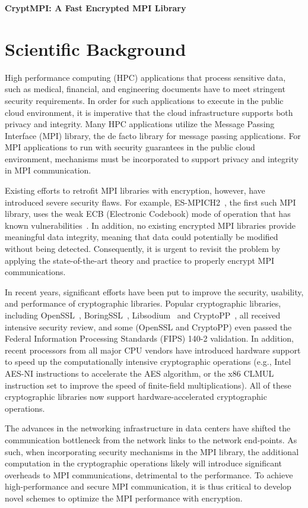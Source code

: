\centerline{\Large\bfseries CryptMPI: A Fast Encrypted MPI Library}

\section{Scientific Background}
High performance computing (HPC) applications that process %
sensitive data, such as medical, financial, and engineering documents have
to meet stringent security requirements. In order for such applications to execute in
the public cloud environment, it is imperative that the cloud infrastructure
supports both privacy and integrity. Many HPC applications utilize the Message
Passing Interface (MPI) library, the de facto library for message
passing applications. For MPI applications to run with security
guarantees in the public cloud environment, mechanisms must be
incorporated to support privacy and integrity in MPI communication.

Existing efforts to retrofit MPI libraries with encryption, however,
have introduced severe security flaws. For example,
ES-MPICH2~\cite{Ruan:2012:EMP:2197079.2197242}, the first such MPI library,
uses the weak ECB (Electronic Codebook) mode of operation that has known
vulnerabilities~\cite[page 89]{Book:KL14}.
In addition, no existing encrypted MPI libraries provide meaningful data
integrity, meaning that data could potentially be modified without being
detected. Consequently, it is urgent to revisit the problem by applying
the state-of-the-art theory and practice to properly
encrypt MPI communications.

In recent years, significant efforts have been put to improve the security,
usability, and performance of cryptographic libraries.
Popular cryptographic libraries, including OpenSSL~\cite{openssl},
BoringSSL~\cite{boringssl},
Libsodium~\cite{libsodium} and CryptoPP~\cite{cryptopp}, all received intensive
security review,
and some (OpenSSL and CryptoPP) even passed the Federal Information Processing
Standards  (FIPS) 140-2 validation. In addition, recent processors from
all major CPU vendors have introduced hardware support to speed up
the computationally intensive
cryptographic operations (e.g., Intel AES-NI instructions to accelerate the AES
algorithm, or the x86 CLMUL instruction set to improve the speed of finite-field
multiplications). All of these cryptographic libraries
now support hardware-accelerated cryptographic operations.

The advances in the networking infrastructure in data centers have
shifted the communication bottleneck from the network links to the network
end-points. As such, when incorporating security mechanisms in
the MPI library, the additional computation in the cryptographic operations
likely will introduce significant overheads to MPI communications,  %
detrimental to the performance. To achieve high-performance and
secure MPI communication, it is thus critical to develop novel schemes to optimize
the MPI performance with encryption. 

